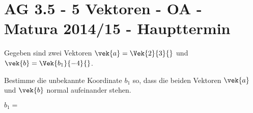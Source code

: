 \section{AG 3.5 - 5 Vektoren - OA - Matura 2014/15 - Haupttermin}

\begin{beispiel}[AG 3.5]{1} %
Gegeben sind zwei Vektoren $\vek{a}=\Vek{2}{3}{}$ und $\vek{b}=\Vek{b_1}{-4}{}$. \leer

Bestimme die unbekannte Koordinate $b_1$ so, dass die beiden Vektoren $\vek{a}$ und $\vek{b}$ normal aufeinander stehen. \leer

$b_1=$ 

\end{beispiel}